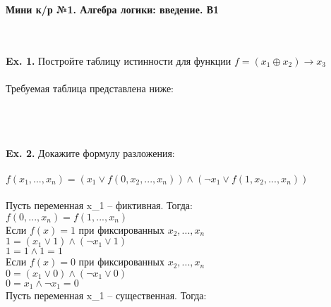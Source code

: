 \begin{center}
\textbf{ \LARGE Мини к/р №1. Алгебра логики: введение. В1}
\end{center}
\\
\\
\textbf{Ex. 1.} Постройте таблицу истинности для функции
$ f = (x_1 \oplus x_2 ) \rightarrow x_3 $
\\
\\
Требуемая таблица представлена ниже:
\\
\begin{center}
\end{center}
\\
\\
\\
\textbf{Ex. 2.} Докажите формулу разложения:
\\
\\
$ f(x_1, ... , x_n) = (x_1 \vee f(0, x_2, ... , x_n)) \wedge (\neg x_1 \vee f(1, x_2, ... , x_n)) $
\\
\\
Пусть переменная x_1 -- фиктивная. Тогда:
\\
$ f(0, ... , x_n) = f(1, ... , x_n) $
\\
Если $ f(x) = 1 $ при фиксированных $ x_2, ... , x_n $
\\
$ 1 = (x_1 \vee 1) \wedge (\neg x_1 \vee 1) $
\\
$ 1 = 1 \wedge 1 = 1 $
\\
Если $ f(x) = 0 $ при фиксированных $ x_2, ... , x_n $
\\
$ 0 = (x_1 \vee 0) \wedge (\neg x_1 \vee 0) $
\\
$ 0 = x_1 \wedge \neg x_1 = 0 $
\\
Пусть переменная x_1 -- существенная. Тогда:
\\
